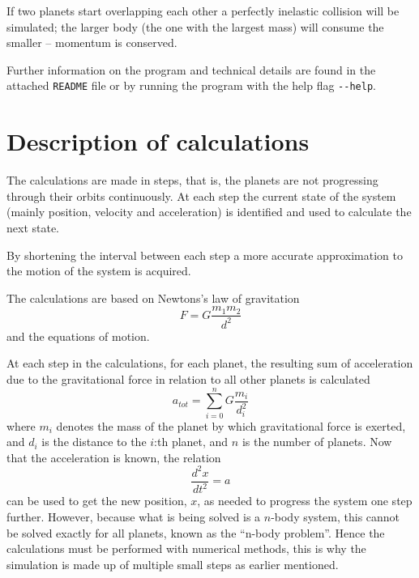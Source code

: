 \documentclass[titlepage, oneside, a4paper, 11pt]{article}
\begin{document}
If two planets start overlapping each other a perfectly inelastic
collision will be simulated; the larger body (the one with the largest
mass) will consume the smaller -- momentum is conserved.

Further information on the program and technical details are found in
the attached \texttt{README} file or by running the program with the
help flag \verb|--help|.



\section{Description of calculations}

The calculations are made in steps, that is, the planets are not
progressing through their orbits continuously. At each step the
current state of the system (mainly position, velocity and
acceleration) is identified and used to calculate the next state.

By shortening the interval between each step a more accurate
approximation to the motion of the system is acquired.

The calculations are based on Newtons's law of gravitation
\begin{equation}
  \label{grav}
  F = G\frac{m_1m_2}{d^2}
\end{equation}
and the equations of motion.

At each step in the calculations, for each planet, the resulting sum
of acceleration due to the gravitational force in relation to all
other planets is calculated
\begin{equation}
  \label{sum}
  a_{tot} = \sum_{i=0}^{n}G\frac{m_{i}}{d_{i}^2}
\end{equation}
where $m_{i}$ denotes the mass of the planet by which gravitational
force is exerted, and $d_{i}$ is the distance to the $i$:th
planet, and $n$ is the number of planets. Now that the acceleration is known, the relation
\begin{equation}
  \label{x2nd}
  \frac{d^2x}{dt^2} = a
\end{equation}
can be used to get the new position, $x$, as needed to progress the
system one step further. However, because what is
being solved is a $n$-body system, this cannot be solved exactly for
all planets, known as the ``n-body
problem''.\cite{wiki:n-body_problem} Hence the calculations must be
performed with numerical methods, this is why the simulation is made
up of multiple small steps as earlier mentioned. 
\end{document}
